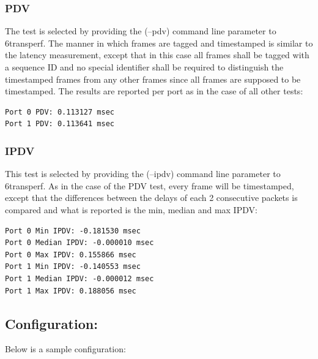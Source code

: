 \documentclass[a4paper,12p]{article}
\begin{document}
\subsubsection{PDV}

The test is selected by providing the (--pdv) command line parameter to 6transperf. The manner in which frames are tagged and timestamped is similar to the latency measurement, except that in this case all frames shall be tagged with a sequence ID and no special identifier shall be required to distinguish the timestamped frames from any other frames since all frames are supposed to be timestamped. The results are reported per port as in the case of all other tests:

\begin{lstlisting}
Port 0 PDV: 0.113127 msec
Port 1 PDV: 0.113641 msec
\end{lstlisting}

\subsubsection{IPDV}

This test is selected by providing the (--ipdv) command line parameter to 6transperf. As in the case of the PDV test, every frame will be timestamped, except that the differences between the delays of each 2 consecutive packets is compared and what is reported is the min, median and max IPDV:

\begin{lstlisting}
Port 0 Min IPDV: -0.181530 msec
Port 0 Median IPDV: -0.000010 msec
Port 0 Max IPDV: 0.155866 msec
Port 1 Min IPDV: -0.140553 msec
Port 1 Median IPDV: -0.000012 msec
Port 1 Max IPDV: 0.188056 msec
\end{lstlisting}

\subsection{Configuration:}


Below is a sample configuration:
\end{document}
